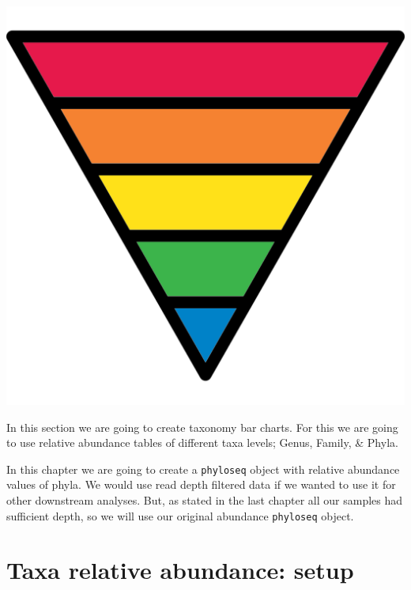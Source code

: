 \documentclass[
]{book}
\begin{document}
\includegraphics{figures/taxa.png}

In this section we are going to create taxonomy bar charts.
For this we are going to use relative abundance tables of different taxa levels; Genus, Family, \& Phyla.

In this chapter we are going to create a \texttt{phyloseq} object with relative abundance values of phyla.
We would use read depth filtered data if we wanted to use it for other downstream analyses.
But, as stated in the last chapter all our samples had sufficient depth, so we will use our original abundance \texttt{phyloseq} object.

\hypertarget{taxa-relative-abundance-setup}{%
\section{Taxa relative abundance: setup}\label{taxa-relative-abundance-setup}}
\end{document}
